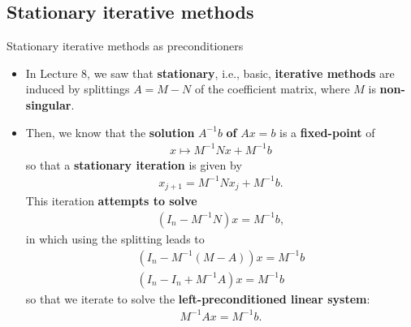 \documentclass[t,usepdftitle=false]{beamer}
\begin{document}
\subsection{Stationary iterative methods}
\begin{frame}{Stationary iterative methods as preconditioners}
\begin{itemize}
\item In Lecture 8, we saw that \textbf{stationary}, i.e., basic, \textbf{iterative methods} are induced by splittings $A=M-N$ of the coefficient matrix, where $M$ is \textbf{non-singular}.
\item[] Then, we know that the \textbf{solution} $A^{-1}b$ \textbf{of} $Ax=b$ is a \textbf{fixed-point} of\vspace{-.05cm}
\begin{align*}
x\mapsto M^{-1}Nx+M^{-1}b
\end{align*}
so that a \textbf{stationary iteration} is given by\vspace{-.05cm}
\begin{align*}
x_{j+1}=M^{-1}Nx_j+M^{-1}b.
\end{align*}
This iteration \textbf{attempts to solve}\vspace{-.05cm}
\begin{align*}
(I_n-M^{-1}N)x=M^{-1}b,
\end{align*}
in which using the splitting leads to\vspace{-.05cm}
\begin{align*}
(I_n-M^{-1}(M-A))x=M^{-1}b\\
(I_n-I_n+M^{-1}A)x=M^{-1}b
\end{align*}
so that we iterate to solve the \textbf{left-preconditioned linear system}:\vspace{-.05cm}
\begin{align*}
M^{-1}Ax=M^{-1}b.
\end{align*}
\end{itemize}
\end{frame}
\end{document}

